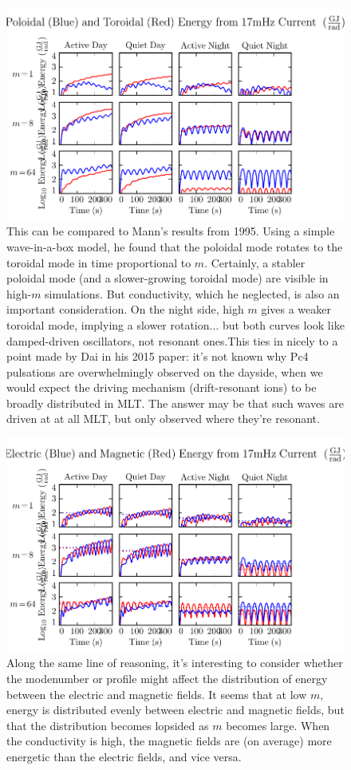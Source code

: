 \documentclass{article}
\begin{document}
\begin{figure}
  \includegraphics{UP_UT.pdf}
  \caption{This can be compared to Mann's results from 1995. Using a simple wave-in-a-box model, he found that the poloidal mode rotates to the toroidal mode in time proportional to $m$. Certainly, a stabler poloidal mode (and a slower-growing toroidal mode) are visible in high-$m$ simulations. But conductivity, which he neglected, is also an important consideration. On the night side, high $m$ gives a weaker toroidal mode, implying a slower rotation... but both curves look like damped-driven oscillators, not resonant ones.\hspace{\textwidth}This ties in nicely to a point made by Dai in his 2015 paper: it's not known why Pc4 pulsations are overwhelmingly observed on the dayside, when we would expect the driving mechanism (drift-resonant ions) to be broadly distributed in MLT. The answer may be that such waves are driven at at all MLT, but only observed where they're resonant. }
  \label{fig_UP_UT}
\end{figure}

\begin{figure}
  \includegraphics{UB_UE.pdf}
  \caption{Along the same line of reasoning, it's interesting to consider whether the modenumber or profile might affect the distribution of energy between the electric and magnetic fields. It seems that at low $m$, energy is distributed evenly between electric and magnetic fields, but that the distribution becomes lopsided as $m$ becomes large. When the conductivity is high, the magnetic fields are (on average) more energetic than the electric fields, and vice versa. }
  \label{fig_UB_UE}
\end{figure}
\end{document}

